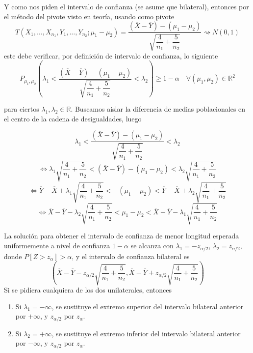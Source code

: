 \documentclass[12pt]{article}
\newcommand{\R}{\mathbb{R}}
\begin{document}
\begin{ejercicio}
\begin{enumerate}
            Y como nos piden el intervalo de confianza (se asume que bilateral), entonces por el método del pivote 
            visto en teoría, usando como pivote 
            $$T(X_1, \ldots, X_{n_1}, Y_1, \ldots, Y_{n_2}; \mu_1 - \mu_2) = \dfrac{(\overline{X} - \overline{Y}) - (\mu_1 - \mu_2)}
            {\sqrt{\dfrac{4}{n_1} + \dfrac{5}{n_2}}} \rightsquigarrow N(0,1)$$
            este debe verificar, por definición de intervalo de confianza, lo siguiente 
            $$P_{\mu_1, \mu_2} \left( \lambda_1 < \dfrac{(\overline{X} - \overline{Y}) - (\mu_1 - \mu_2)}
            {\sqrt{\dfrac{4}{n_1} + \dfrac{5}{n_2}}} < \lambda_2 \right) \geqslant 1 - \alpha \quad \forall (\mu_1, \mu_2) \in \R^2$$

            para ciertos $\lambda_1, \lambda_2 \in \R$. Buscamos aislar la diferencia de medias poblacionales en el centro de la 
            cadena de desigualdades, luego

            $$\lambda_1 < \dfrac{(\overline{X} - \overline{Y}) - (\mu_1 - \mu_2)}
            {\sqrt{\dfrac{4}{n_1} + \dfrac{5}{n_2}}} < \lambda_2$$ $$\iff 
            \lambda_1 \sqrt{\dfrac{4}{n_1} + \dfrac{5}{n_2}} < (\overline{X} - \overline{Y}) - (\mu_1 - \mu_2) < 
            \lambda_2 \sqrt{\dfrac{4}{n_1} + \dfrac{5}{n_2}}$$ $$\iff 
            \overline{Y} - \overline{X} + \lambda_1 \sqrt{\dfrac{4}{n_1} + \dfrac{5}{n_2}} < 
            -(\mu_1 - \mu_2) < \overline{Y} - \overline{X} + \lambda_2 \sqrt{\dfrac{4}{n_1} + \dfrac{5}{n_2}} $$ $$\iff
            \overline{X} - \overline{Y} - \lambda_2 \sqrt{\dfrac{4}{n_1} + \dfrac{5}{n_2}} < 
            \mu_1 - \mu_2 < \overline{X} - \overline{Y} - \lambda_1 \sqrt{\dfrac{4}{n_1} + \dfrac{5}{n_2}}$$

            La solución para obtener el intervalo de confianza de menor longitud esperada uniformemente a nivel de confianza $1-\alpha$
            se alcanza con $\lambda_1 = - z_{\alpha/2}$, $\lambda_2 = z_{\alpha/2}$, donde $P[Z > z_{\alpha}] > \alpha$, y el intervalo
            de confianza bilateral es 
            $$\left(\overline{X} - \overline{Y} - z_{\alpha/2} \sqrt{\dfrac{4}{n_1} + \dfrac{5}{n_2}},
            \overline{X} - \overline{Y} + z_{\alpha/2} \sqrt{\dfrac{4}{n_1} + \dfrac{5}{n_2}} \right)$$
            Si se pidiera cualquiera de los dos unilaterales, entonces
            \begin{enumerate}
                \item Si $\lambda_1 = -\infty$, se sustituye el extremo superior del intervalo bilateral anterior por $+\infty$,
                y $z_{\alpha/2}$ por $z_{\alpha}$.
                \item Si $\lambda_2 = +\infty$, se sustituye el extremo inferior del intervalo bilateral anterior por $-\infty$,
                y $z_{\alpha/2}$ por $z_{\alpha}$.
            \end{enumerate}


\end{enumerate}
\end{ejercicio}
\end{document}
